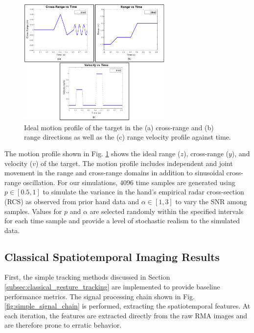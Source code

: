\documentclass[10pt,journal,final]{IEEEtran}
\begin{document}
\begin{figure}[h]
	\centering
	\includegraphics[width=3in]{ideal_motion.jpg}
	\caption{Ideal motion profile of the target in the (a) cross-range and (b) range directions as well as the (c) range velocity profile against time.}
	\label{fig:ideal_motion}
\end{figure}

The motion profile shown in Fig. \ref{fig:ideal_motion} shows the ideal range ($z$), cross-range ($y$), and velocity ($v$) of the target. 
The motion profile includes independent and joint movement in the range and cross-range domains in addition to sinusoidal cross-range oscillation.
For our simulations, $4096$ time samples are generated using $p \in [0.5,1]$ to simulate the variance in the hand's empirical radar cross-section (RCS) as observed from prior hand data and $\alpha \in [1,3]$ to vary the SNR among samples. 
Values for $p$ and $\alpha$ are selected randomly within the specified intervals for each time sample and provide a level of stochastic realism to the simulated data.

\subsection{Classical Spatiotemporal Imaging Results}
\label{subsec:simple_gesture_tracking_results}
First, the simple tracking methods discussed in Section \ref{subsec:classical_gesture_tracking} are implemented to provide baseline performance metrics.
The signal processing chain shown in Fig. \ref{fig:simple_signal_chain} is performed, extracting the spatiotemporal features. 
At each iteration, the features are extracted directly from the raw RMA images and are therefore prone to erratic behavior. 
\end{document}
